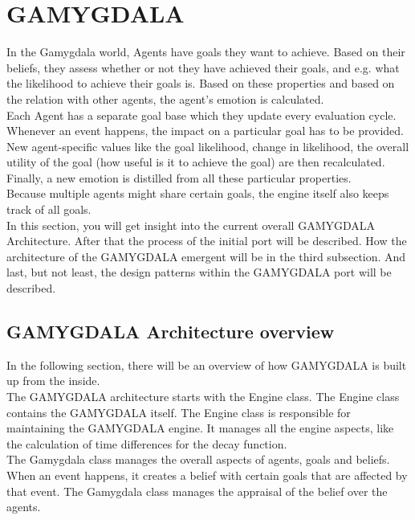 \section{GAMYGDALA}
In the Gamygdala world, Agents have goals they want to achieve. Based on their beliefs, they assess whether or not they have achieved their goals, and e.g. what the likelihood to achieve their goals is. Based on these properties and based on the relation with other agents, the agent's emotion is calculated. \\ 

Each Agent has a separate goal base which they update every evaluation cycle. Whenever an event happens, the impact on a particular goal has to be provided. New agent-specific values like the goal likelihood, change in likelihood, the overall utility of the goal (how useful is it to achieve the goal) are then recalculated. Finally, a new emotion is distilled from all these particular properties. \\

Because multiple agents might share certain goals, the engine itself also keeps track of all goals. \\

In this section, you will get insight into the current overall GAMYGDALA Architecture. After that the process of the initial port will be described. How the architecture of the GAMYGDALA emergent will be in the third subsection. And last, but not least, the design patterns within the GAMYGDALA port will be described. 

\subsection{GAMYGDALA Architecture overview}
In the following section, there will be an overview of how GAMYGDALA is built up from the inside. \\

The GAMYGDALA architecture starts with the Engine class. The Engine class contains the GAMYGDALA itself. The Engine class is responsible for maintaining the GAMYGDALA engine. It manages all the engine aspects, like the calculation of time differences for the decay function. \\

The Gamygdala class manages the overall aspects of agents, goals and beliefs. When an event happens, it creates a belief with certain goals that are affected by that event. The Gamygdala class manages the appraisal of the belief over the agents. \\

